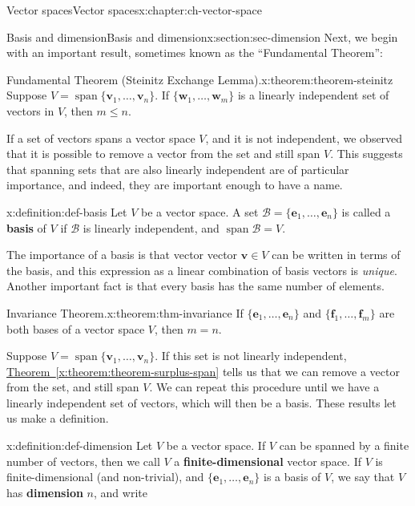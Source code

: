 \documentclass[oneside,10pt,]{book}
\newcommand{\xreffont}{\relax}
\newcommand{\terminology}[1]{\textbf{#1}}
\numberwithin{equation}{section}
\newcommand{\spn}{\operatorname{span}}
\newcommand{\vv}{\mathbf{v}}
\newcommand{\ww}{\mathbf{w}}
\begin{document}
\begin{chapterptx}{Vector spaces}{}{Vector spaces}{}{}{x:chapter:ch-vector-space}
\typeout{************************************************}
%
\begin{sectionptx}{Basis and dimension}{}{Basis and dimension}{}{}{x:section:sec-dimension}
Next, we begin with an important result, sometimes known as the ``Fundamental Theorem'':%
\begin{theorem}{Fundamental Theorem (Steinitz Exchange Lemma).}{}{x:theorem:theorem-steinitz}%
Suppose \(V = \spn\{\vv_1,\ldots, \vv_n\}\). If \(\{\ww_1,\ldots, \ww_m\}\) is a linearly independent set of vectors in \(V\), then \(m\leq n\).%
\end{theorem}
If a set of vectors spans a vector space \(V\), and it is not independent, we observed that it is possible to remove a vector from the set and still span \(V\). This suggests that spanning sets that are also linearly independent are of particular importance, and indeed, they are important enough to have a name.%
\begin{definition}{}{x:definition:def-basis}%
Let \(V\) be a vector space. A set \(\mathcal{B}=\{\mathbf{e}_1,\ldots, \mathbf{e}_n\}\) is called a \terminology{basis} of \(V\) if \(\mathcal{B}\) is linearly independent, and \(\operatorname{span}\mathcal{B} = V\).%
\end{definition}
The importance of a basis is that vector vector \(\vv\in V\) can be written in terms of the basis, and this expression as a linear combination of basis vectors is \emph{unique}. Another important fact is that every basis has the same number of elements.%
\begin{theorem}{Invariance Theorem.}{}{x:theorem:thm-invariance}%
If \(\{\mathbf{e}_1,\ldots, \mathbf{e}_n\}\) and \(\{\mathbf{f}_1,\ldots, \mathbf{f}_m\}\) are both bases of a vector space \(V\), then \(m=n\).%
\end{theorem}
Suppose \(V=\spn\{\vv_1,\ldots,\vv_n\}\). If this set is not linearly independent, \hyperref[x:theorem:theorem-surplus-span]{Theorem~{\xreffont\ref{x:theorem:theorem-surplus-span}}} tells us that we can remove a vector from the set, and still span \(V\). We can repeat this procedure until we have a linearly independent set of vectors, which will then be a basis. These results let us make a definition.%
\begin{definition}{}{x:definition:def-dimension}%
Let \(V\) be a vector space. If \(V\) can be spanned by a finite number of vectors, then we call \(V\) a \terminology{finite-dimensional} vector space. If \(V\) is finite-dimensional (and non-trivial), and \(\{\mathbf{e}_1,\ldots, \mathbf{e}_n\}\) is a basis of \(V\), we say that \(V\) has \terminology{dimension} \(n\), and write%

\end{definition}
\end{sectionptx}
\end{chapterptx}
\end{document}
